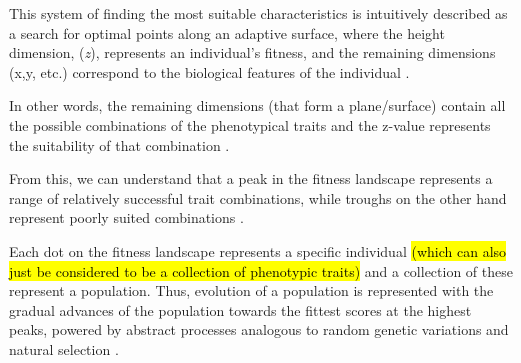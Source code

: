 This system of finding the most suitable characteristics is intuitively described as a search for optimal points along an adaptive surface, where the height dimension, (\textit{z}), represents an individual's fitness, and the remaining dimensions (x,y, etc.) correspond to the biological features of the individual \cite{EibenSmith2003}. 

In other words, the remaining dimensions (that form a plane/surface) contain all the possible combinations of the phenotypical traits and the z-value represents the suitability of that combination \cite{EibenSmith2003}.



From this, we can understand that a peak in the fitness landscape represents a range of relatively successful trait combinations, while troughs on the other hand represent poorly suited combinations \cite{EibenSmith2003}.

Each dot on the fitness landscape represents a specific individual \hl{(which can also just be considered to be a collection of phenotypic traits)} and a collection of these represent a population. Thus, evolution of a population is represented with the gradual advances of the population towards the fittest scores at the highest peaks, powered by abstract processes analogous to random genetic variations and natural selection \cite{EibenSmith2003}.



